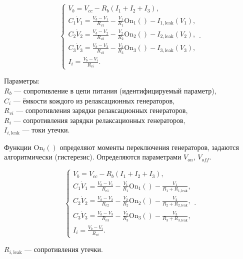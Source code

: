 \begin{equation}
  \begin{cases}
    V_b = V_{cc} - R_b ( I_1 + I_2 + I_3 ), \\
      C_1 \dot{V}_1 = \frac{V_b-V_1}{R_{v1}} - \frac{V_1}{R_1} \mathrm{On}_1() - I_{1,\mathrm{leak}}(V_1), \\
      C_2 \dot{V}_2 = \frac{V_b-V_2}{R_{v2}} - \frac{V_2}{R_2} \mathrm{On}_2() - I_{2,\mathrm{leak}}(V_2), \\
      C_3 \dot{V}_3 = \frac{V_b-V_3}{R_{v3}} - \frac{V_3}{R_3} \mathrm{On}_3() - I_{3,\mathrm{leak}}(V_3), \\
      I_i = \frac{V_b-V_i}{R_{vi}}.
  \end{cases}.
    \label{atu:eq:relax3}
\end{equation}

Параметры: \\
$R_b$ --- сопротивление в цепи питания (идентифицируемый параметр), \\
$C_i$ --- ёмкости кождого из релаксационных генераторов, \\
$R_{vi}$ --- сопротивления зарядки релаксационных генераторов, \\
$R_{i}$ --- сопротивления зарядки релаксационных генераторов, \\
$I_{i,\mathrm{leak}}$ --- токи утечки.

Функции $ \mathrm{On}_i() $ определяют моменты переключения генераторов,
задаются алгоритмически (гистерезис). Определяются параметрами
$V_{on}$, $V_{off}$.

\begin{equation}
  \begin{cases}
    V_b = V_{cc} - R_b ( I_1 + I_2 + I_3 ), \\
      C_1 \dot{V}_1 = \frac{V_b-V_1}{R_{v1}} - \frac{V_1}{R_1} \mathrm{On}_1() - \frac{V_1}{R_1+R_{1,\mathrm{leak}}}, \\
      C_2 \dot{V}_2 = \frac{V_b-V_2}{R_{v2}} - \frac{V_2}{R_2} \mathrm{On}_2() - \frac{V_2}{R_2+R_{2,\mathrm{leak}}}, \\
      C_3 \dot{V}_3 = \frac{V_b-V_3}{R_{v3}} - \frac{V_3}{R_3} \mathrm{On}_3() - \frac{V_3}{R_3+R_{3,\mathrm{leak}}}, \\
      I_i = \frac{V_b-V_i}{R_{vi}}.
  \end{cases}.
    \label{atu:eq:relax3_linleak}
\end{equation}

$R_{i,\mathrm{leak}}$ --- сопротивления утечки.



